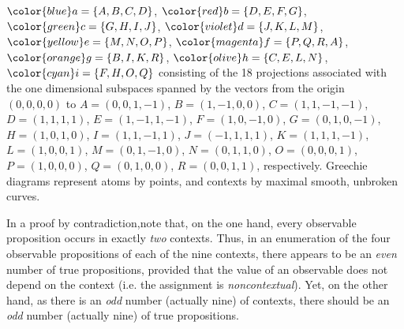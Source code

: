 $\color{blue}a=\{A,B,C,D\}$,
$\color{red}b=\{D,E,F,G\}$,
$\color{green}c=\{G,H,I,J\}$,
$\color{violet}d=\{J,K,L,M\}$,
$\color{yellow}e=\{M,N,O,P\}$,
$\color{magenta}f=\{P,Q,R,A\}$,
$\color{orange}g=\{B,I,K,R\}$,
$\color{olive}h=\{C,E,L,N\}$,
$\color{cyan}i=\{F,H,O,Q\}$
consisting of the 18 projections associated with the one dimensional subspaces spanned by  the vectors from the origin $(0,0,0,0)$ to
$ A=(0,0,1,-1)    $,
$ B=(1,-1,0,0)    $,
$ C=(1,1,-1,-1)   $,
$ D=(1,1,1,1)     $,
$  E=(1,-1,1,-1)  $,
$  F=(1,0,-1,0)   $,
$  G=(0,1,0,-1)   $,
$  H=(1,0,1,0)    $,
$  I=(1,1,-1,1)   $,
$ J=(-1,1,1,1)    $,
$ K=(1,1,1,-1)    $,
$ L=(1,0,0,1)     $,
$ M=(0,1,-1,0)    $,
$  N=(0,1,1,0)    $,
$  O=(0,0,0,1)    $,
$  P=(1,0,0,0)    $,
$  Q=(0,1,0,0)    $,
$  R=(0,0,1,1)    $, respectively.
%
Greechie diagrams represent atoms by points, and  contexts by maximal smooth, unbroken curves.

{\color{OliveGreen}\bproof
In a proof by contradiction,note that, on the one hand, every observable proposition occurs in exactly {\em two} contexts.
Thus, in an enumeration of the four observable propositions of each of the nine contexts,
there appears to be an {\em even} number of true propositions,
provided that the value of an observable does not depend on the context (i.e. the assignment is {\em noncontextual}).
Yet, on the other hand, as there is an {\em odd} number (actually nine) of contexts,
there should be an {\em odd} number (actually nine) of true propositions.
\bproof
}





\begin{center}
{\color{olive}   \Huge
 \floweroneleft
}
\end{center}


